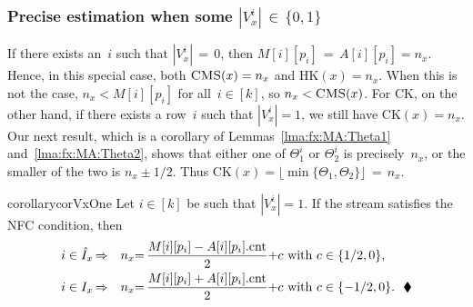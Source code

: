 \subsubsection{Precise estimation when some $|V^i_x| \,{\in}\, \{0,1\}$}
If there exists an~$i$ such that $\left|{V_x^i}\right|\,{=}\,0$, then $M[i][p_i]\,{=}\,A[i][p_i]=n_x$.  Hence, in this special case, both $\textnormal{\textsc{CMS}}(x)=n_x$ and $\mathrm{HK}(x)=n_x$.  When this is not the case, $n_x < M[i][p_i]$ for all~$i\in[k]$, so $n_x < \textnormal{\textsc{CMS}}(x)$.  For CK, on the other hand, if there exists a row~$i$ such that $|V^i_x|=1$, we still have $\mathrm{CK}(x)=n_x$.  Our next result, which is a corollary of Lemmas~\ref{lma:fx:MA:Theta1} and~\ref{lma:fx:MA:Theta2}, shows that either one of $\Theta_1^i$ or $\Theta_2^i$ is precisely~$n_x$, or the smaller of the two is $n_x \pm 1/2$.  Thus $\mathrm{CK}(x)=\lfloor \min\{\Theta_1,\Theta_2\} \rfloor\,{=}\,n_x$. 
\begin{restatable}{corollary}{corVxOne}\label{cor:fx:MA:Theta13:nx} Let $i \in [k]$ be such that $|V_x^i|=1$. If the stream satisfies the NFC condition, then
	\begin{align*}
		i \in \hat{I}_x &\,{\Rightarrow}&
				n_x&{=}\,\frac{M[i][p_i] - A[i][p_i].\textup{cnt}}{2} {+} c \mbox{ with $c \in \{1/2, 0\}$,} \\
		i \in I_x &\,{\Rightarrow}&
				 n_x&{=}\,\frac{M[i][p_i] + A[i][p_i].\textup{cnt}}{2} {+} c \mbox{ with $c \in \{-1/2,0\}$.} \ \ \blacklozenge
		\end{align*} 
	\hfill
\end{restatable}

